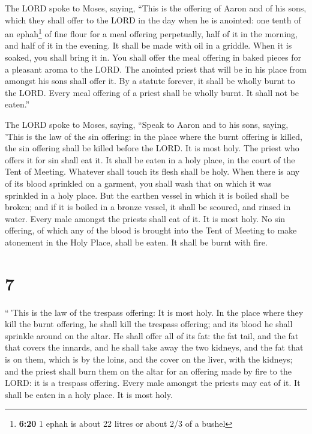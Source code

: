  The LORD spoke to Moses, saying,  ``This
is the offering of Aaron and of his sons, which they shall offer to the
LORD in the day when he is anointed: one tenth of an ephah\footnote{\textbf{6:20}
  1 ephah is about 22 litres or about 2/3 of a bushel} of fine flour for
a meal offering perpetually, half of it in the morning, and half of it
in the evening.  It shall be made with oil in a griddle.
When it is soaked, you shall bring it in. You shall offer the meal
offering in baked pieces for a pleasant aroma to the LORD.
 The anointed priest that will be in his place from
amongst his sons shall offer it. By a statute forever, it shall be
wholly burnt to the LORD.  Every meal offering of a
priest shall be wholly burnt. It shall not be eaten.''

 The LORD spoke to Moses, saying,  ``Speak
to Aaron and to his sons, saying, 'This is the law of the sin offering:
in the place where the burnt offering is killed, the sin offering shall
be killed before the LORD. It is most holy.  The priest
who offers it for sin shall eat it. It shall be eaten in a holy place,
in the court of the Tent of Meeting.  Whatever shall
touch its flesh shall be holy. When there is any of its blood sprinkled
on a garment, you shall wash that on which it was sprinkled in a holy
place.  But the earthen vessel in which it is boiled
shall be broken; and if it is boiled in a bronze vessel, it shall be
scoured, and rinsed in water.  Every male amongst the
priests shall eat of it. It is most holy.  No sin
offering, of which any of the blood is brought into the Tent of Meeting
to make atonement in the Holy Place, shall be eaten. It shall be burnt
with fire.

\hypertarget{section-6}{%
\section{7}\label{section-6}}

 ``\,'This is the law of the trespass offering: It is most
holy.  In the place where they kill the burnt offering, he
shall kill the trespass offering; and its blood he shall sprinkle around
on the altar.  He shall offer all of its fat: the fat
tail, and the fat that covers the innards,  and he shall
take away the two kidneys, and the fat that is on them, which is by the
loins, and the cover on the liver, with the kidneys;  and
the priest shall burn them on the altar for an offering made by fire to
the LORD: it is a trespass offering.  Every male amongst
the priests may eat of it. It shall be eaten in a holy place. It is most
holy.


